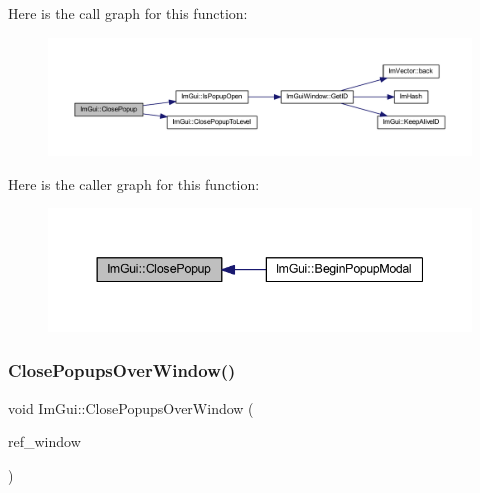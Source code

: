 Here is the call graph for this function\+:
\nopagebreak
\begin{figure}[H]
\begin{center}
\leavevmode
\includegraphics[width=350pt]{namespace_im_gui_a7f3f82fc44d67af554faf104b913ea55_cgraph}
\end{center}
\end{figure}
Here is the caller graph for this function\+:
\nopagebreak
\begin{figure}[H]
\begin{center}
\leavevmode
\includegraphics[width=344pt]{namespace_im_gui_a7f3f82fc44d67af554faf104b913ea55_icgraph}
\end{center}
\end{figure}
\mbox{\label{namespace_im_gui_a2febc7edd279491870160d390fd6e2e5}} 
\subsubsection{\texorpdfstring{Close\+Popups\+Over\+Window()}{ClosePopupsOverWindow()}}
{\footnotesize\ttfamily void Im\+Gui\+::\+Close\+Popups\+Over\+Window (\begin{DoxyParamCaption}\item[{\mbox{\hyperlink{struct_im_gui_window}{Im\+Gui\+Window}} $\ast$}]{ref\+\_\+window }\end{DoxyParamCaption})}

